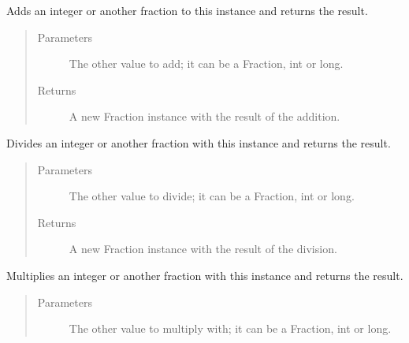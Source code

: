 \documentclass[letterpaper,10pt,english]{sphinxhowto}
\begin{document}
\begin{fulllineitems}
\begin{fulllineitems}
\begin{quote}
\begin{description}
\end{description}\end{quote}

\end{fulllineitems}


\begin{fulllineitems}
\label{\detokenize{fraction:fraction.Fraction.__radd__}}
Adds an integer or another fraction to this instance and returns the result.
\begin{quote}\begin{description}
\item[{Parameters}] \leavevmode
{} \textendash{} The other value to add; it can be a Fraction, int or long.

\item[{Returns}] \leavevmode
A new Fraction instance with the result of the addition.

\end{description}\end{quote}

\end{fulllineitems}


\begin{fulllineitems}
\label{\detokenize{fraction:fraction.Fraction.__rdiv__}}
Divides an integer or another fraction with this instance and returns the result.
\begin{quote}\begin{description}
\item[{Parameters}] \leavevmode
{} \textendash{} The other value to divide; it can be a Fraction, int or long.

\item[{Returns}] \leavevmode
A new Fraction instance with the result of the division.

\end{description}\end{quote}

\end{fulllineitems}


\begin{fulllineitems}
\label{\detokenize{fraction:fraction.Fraction.__rmul__}}
Multiplies an integer or another fraction with this instance and returns the result.
\begin{quote}\begin{description}
\item[{Parameters}] \leavevmode
{} \textendash{} The other value to multiply with; it can be a Fraction, int or long.


\end{description}
\end{quote}
\end{fulllineitems}
\end{fulllineitems}
\end{document}
